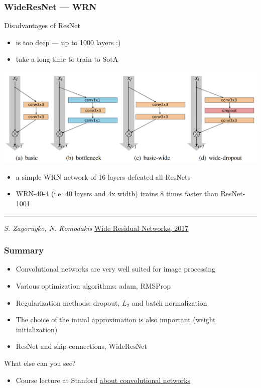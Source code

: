 \documentclass[fullscreen=true, bookmarks=true, hyperref={pdfencoding=unicode}]{beamer}
\begin{document}
\begin{frame}
  \frametitle{WideResNet — WRN}
  Disadvantages of ResNet
  \begin{itemize}
    \item is too deep — up to 1000 layers :)
    \item take a long time to train to SotA
  \end{itemize}
  \begin{center}
    \includegraphics[keepaspectratio,
                     width=0.6\paperwidth]{wrn_blocks.png}
  \end{center}

  \begin{itemize}
    \item a simple WRN network of 16 layers defeated all ResNets
    \item WRN-40-4 (i.e. 40 layers and 4x width) trains 8 times faster than ResNet-1001
  \end{itemize}

  \noindent\rule{8cm}{0.4pt}

  {\it S. Zagoruyko, N. Komodakis} \href{https://arxiv.org/pdf/1605.07146.pdf}{Wide Residual Networks, 2017}


\end{frame}


\begin{frame}
  \frametitle{Summary}
   \begin{itemize}
     \item Convolutional networks are very well suited for image processing
     \item Various optimization algorithms: adam, RMSProp
     \item Regularization methods: dropout, $L_2$ and batch normalization
     \item The choice of the initial approximation is also important (weight initialization)
     \item ResNet and skip-connections, WideResNet
   \end{itemize}

   \pause
   What else can you see?
   \begin{itemize}
     \item Course lecture at Stanford \href{https://www.youtube.com/watch?v=DAOcjicFr1Y}{about convolutional networks}
   \end{itemize}
\end{frame}
\end{document}

